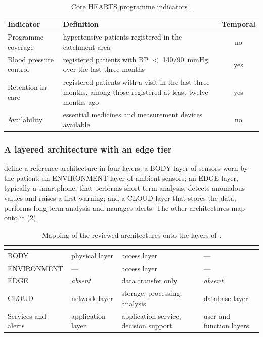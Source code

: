 \begin{table}[htbp]
\centering\small
\caption{Core HEARTS programme indicators \parencite{who2023hypertension}.}\label{tab:hearts}
\begin{tabularx}{\textwidth}{@{}>{\raggedright\arraybackslash}p{3.6cm} X c@{}}
\toprule
\textbf{Indicator} & \textbf{Definition} & \textbf{Temporal} \\
\midrule
Programme coverage & hypertensive patients registered in the catchment area & no \\
Blood pressure control & registered patients with BP $<$ 140/90~mmHg over the last three months & yes \\
Retention in care & registered patients with a visit in the last three months, among those registered at least twelve months ago & yes \\
Availability & essential medicines and measurement devices available & no \\
\bottomrule
\end{tabularx}
\end{table}

\subsubsection{A layered architecture with an edge tier}\label{sec:multitier}\label{sec:edge-triage}

\Textcite{mucchi2021} define a reference architecture in four layers: a BODY layer of sensors worn by the patient; an ENVIRONMENT layer of ambient sensors; an EDGE layer, typically a smartphone, that performs short-term analysis, detects anomalous values and raises a first warning; and a CLOUD layer that stores the data, performs long-term analysis and manages alerts. The other architectures map onto it (\cref{tab:layer-mapping}).

\begin{table}[htbp]
\centering\footnotesize
\caption{Mapping of the reviewed architectures onto the layers of \textcite{mucchi2021}.}\label{tab:layer-mapping}
\begin{tabularx}{\textwidth}{@{}>{\raggedright\arraybackslash}p{2.5cm} >{\raggedright\arraybackslash}X >{\raggedright\arraybackslash}X >{\raggedright\arraybackslash}X@{}}
\toprule
\textbf{\textcite{mucchi2021}} & \textbf{\textcite{efendi2025}} & \textbf{\textcite{liu2025review}} & \textbf{\textcite{yazdani2018}} \\
\midrule
BODY & physical layer & access layer & --- \\
ENVIRONMENT & --- & access layer & --- \\
EDGE & \emph{absent} & data transfer only & \emph{absent} \\
CLOUD & network layer & storage, processing, analysis & database layer \\
Services and alerts & application layer & application service, decision support & user and function layers \\
\bottomrule
\end{tabularx}
\end{table}

